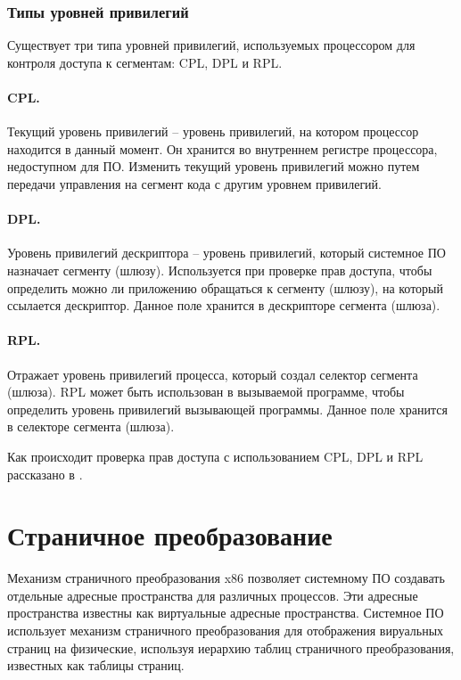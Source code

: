 \subsubsection*{Типы уровней привилегий}
Существует три типа уровней привилегий, используемых процессором для контроля доступа к сегментам: CPL, DPL и RPL.

\paragraph{CPL.} Текущий уровень привилегий -- уровень привилегий, на котором процессор находится в данный
момент. Он хранится во внутреннем регистре процессора, недоступном для ПО. Изменить текущий уровень привилегий
можно путем передачи управления на сегмент кода с другим уровнем привилегий.

\paragraph{DPL.} Уровень привилегий дескриптора -- уровень привилегий, который системное ПО назначает сегменту (шлюзу).
Используется при проверке прав доступа, чтобы определить можно ли приложению обращаться к сегменту (шлюзу), на который
ссылается дескриптор. Данное поле хранится в дескрипторе сегмента (шлюза).

\paragraph{RPL.} Отражает уровень привилегий процесса, который создал селектор сегмента (шлюза). RPL может быть использован
в вызываемой программе, чтобы определить уровень привилегий вызывающей программы. Данное поле хранится
в селекторе сегмента (шлюза).

Как происходит проверка прав доступа с использованием CPL, DPL и RPL рассказано в \cite{amd_pm_v2}.



\section{Страничное преобразование}
\label{sec:page_translation}
Механизм страничного преобразования x86 позволяет системному ПО создавать отдельные адресные
пространства для различных процессов. Эти адресные пространства известны как
виртуальные адресные пространства. Системное ПО использует механизм страничного преобразования
для отображения вируальных страниц на физические, используя иерархию таблиц страничного преобразования,
известных как таблицы страниц.

